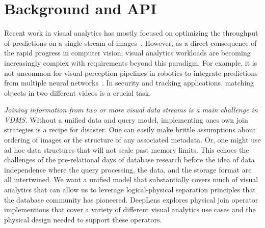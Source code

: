 \section{Background and API}
Recent work in visual analytics has mostly focused on optimizing the throughput of predictions on a single stream of images~\cite{anderson2018predicate, kang2018blazeit,kang2017noscope, wu2018querying, sparks2017keystoneml}.
However, as a direct consequence of the rapid progress in computer vision, visual analytics workloads are becoming increasingly complex with requirements beyond this paradigm. 
For example, it is not uncommon for visual perception pipelines in robotics to integrate predictions from multiple neural networks~\cite{hodson2018robots}.
In security and tracking applications, matching objects in two different videos is a crucial task.

\emph{Joining information from two or more visual data streams is a main challenge in VDMS.}
Without a unified data and query model, implementing ones own join strategies is a recipe for disaster.
One can easily make brittle assumptions about ordering of images or the structure of any associated metadata.
Or, one might use ad hoc data structures that will not scale past memory limits.
This echoes the challenges of the pre-relational days of database research before the idea of data independence where the query processing, the data, and the storage format are all intertwined.
We want a unified model that substantially covers much of visual analytics that can allow us to leverage logical-physical separation principles that the database community has pioneered.
 \textsf{DeepLens} explores physical join operator implementions that cover a variety of different visual analytics use cases and the physical design needed to support these operators.

